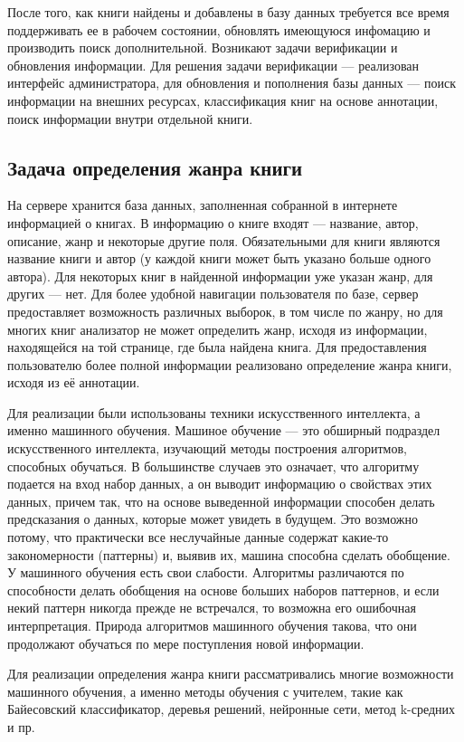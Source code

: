 \documentclass[a4paper]{report}
\begin{document}
После того, как книги найдены и добавлены в базу данных требуется все время поддерживать ее в рабочем состоянии, обновлять имеющуюся инфомацию и производить поиск дополнительной. Возникают задачи верификации и обновления информации. Для решения задачи верификации --- реализован интерфейс администратора, для обновления и пополнения базы данных --- поиск информации на внешних ресурсах, классификация книг на основе аннотации, поиск информации внутри отдельной книги.

\subsection{Задача определения жанра книги}

На сервере хранится база данных, заполненная собранной в интернете информацией о книгах. В информацию о книге входят --- название, автор, описание, жанр и некоторые другие поля. Обязательными для книги являются название книги и автор (у каждой книги может быть указано больше одного автора). Для некоторых книг в найденной информации уже указан жанр, для других --- нет. Для более удобной навигации пользователя по базе, сервер предоставляет возможность различных выборок, в том числе по жанру, но для многих книг анализатор не может определить жанр, исходя из информации, находящейся на той странице, где была найдена книга. Для предоставления пользователю более полной информации реализовано определение жанра книги, исходя из её аннотации. 

Для реализации были использованы техники искусственного интеллекта, а именно машинного обучения. Машиное обучение --- это обширный подраздел искусственного интеллекта, изучающий методы построения алгоритмов, способных обучаться. В большинстве случаев это означает, что алгоритму подается на вход набор данных, а он выводит информацию о свойствах этих данных, причем так, что на основе выведенной информации способен делать предсказания о данных, которые может увидеть в будущем. Это возможно потому, что практически все неслучайные данные содержат какие-то закономерности (паттерны) и, выявив их, машина способна сделать обобщение. У машинного обучения есть свои слабости. Алгоритмы различаются по способности делать обобщения на основе больших наборов паттернов, и если некий паттерн никогда прежде не встречался, то возможна его ошибочная интерпретация. Природа алгоритмов машинного обучения такова, что они продолжают обучаться по мере поступления новой информации.

Для реализации определения жанра книги рассматривались многие возможности машинного обучения, а именно методы обучения с учителем, такие как Байесовский классификатор, деревья решений, нейронные сети, метод k-средних и пр. 
\end{document}
